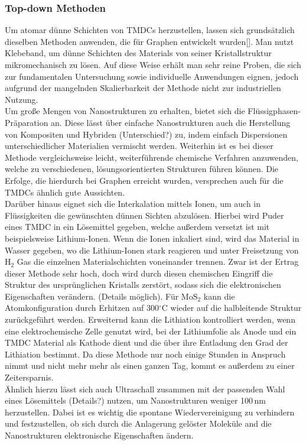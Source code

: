 \subsubsection*{Top-down Methoden}
Um atomar dünne Schichten von TMDCs herzustellen, lassen sich grundsätzlich dieselben Methoden anwenden, die für Graphen entwickelt wurden[]. Man nutzt Klebeband, um dünne Schichten des Materials von seiner Kristallstruktur mikromechanisch zu lösen. Auf diese Weise erhält man sehr reine Proben, die sich zur fundamentalen Untersuchung sowie individuelle Anwendungen eignen, jedoch aufgrund der mangelnden Skalierbarkeit der Methode nicht zur industriellen Nutzung. \\
Um große Mengen von Nanostrukturen zu erhalten, bietet sich die Flüssigphasen-Präparation an. Diese lässt über einfache Nanostrukturen auch die Herstellung von Kompositen und Hybriden (Unterschied?) zu, indem einfach Dispersionen unterschiedlicher Materialien vermischt werden. Weiterhin ist es bei dieser Methode vergleichsweise leicht, weiterführende chemische Verfahren anzuwenden, welche zu verschiedenen, lösungsorientierten Strukturen führen können. Die Erfolge, die hierdurch bei Graphen erreicht wurden, versprechen auch für die TMDCs ähnlich gute Aussichten.\\
Darüber hinaus eignet sich die Interkalation mittels Ionen, um auch in Flüssigkeiten die gewünschten dünnen Sichten abzulösen. Hierbei wird Puder eines TMDC in ein Lösemittel gegeben, welche außerdem versetzt ist mit beispielsweise Lithium-Ionen. Wenn die Ionen inkaliert sind, wird das Material in Wasser gegeben, wo die Lithium-Ionen stark reagieren und unter Freisetzung von H$_2$ Gas die einzelnen Materialschichten voneinander trennen. Zwar ist der Ertrag dieser Methode sehr hoch, doch wird durch diesen chemischen Eingriff die Struktur des ursprünglichen Kristalls zerstört, sodass sich die elektronischen Eigenschaften verändern. (Details möglich). Für MoS$_2$ kann die Atomkonfiguration durch Erhitzen auf 300$^\circ$C wieder auf die halbleitende Struktur zurückgeführt werden. Erweiternd kann die Lithiation kontrolliert werden, wenn eine elektrochemische Zelle genutzt wird, bei der Lithiumfolie als Anode und ein TMDC Material als Kathode dient und die über ihre Entladung den Grad der Lithiation bestimmt. Da diese Methode nur noch einige Stunden in Anspruch nimmt und nicht mehr mehr als einen ganzen Tag, kommt es außerdem zu einer Zeitersparnis.\\
Ähnlich hierzu lässt sich auch Ultraschall zusammen mit der passenden Wahl eines Lösemittels (Details?) nutzen, um Nanostrukturen weniger 100\,nm herzustellen. Dabei ist es wichtig die spontane Wiedervereinigung zu verhindern und festzustellen, ob sich durch die Anlagerung gelöster Moleküle and die Nanostrukturen elektronische Eigenschaften ändern. \\
